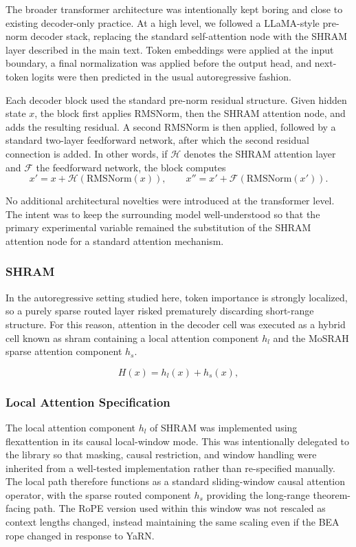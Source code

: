 \documentclass[11pt]{article}
\begin{document}
The broader transformer architecture was intentionally kept boring and close to existing decoder-only practice. At a high level, we followed a LLaMA-style pre-norm decoder stack, replacing the standard self-attention node with the SHRAM layer described in the main text. Token embeddings were applied at the input boundary, a final normalization was applied before the output head, and next-token logits were then predicted in the usual autoregressive fashion.

Each decoder block used the standard pre-norm residual structure. Given hidden state $x$, the block first applies RMSNorm, then the SHRAM attention node, and adds the resulting residual. A second RMSNorm is then applied, followed by a standard two-layer feedforward network, after which the second residual connection is added. In other words, if $\mathcal{H}$ denotes the SHRAM attention layer and $\mathcal{F}$ the feedforward network, the block computes
\[
x' = x + \mathcal{H}(\mathrm{RMSNorm}(x)),
\qquad
x'' = x' + \mathcal{F}(\mathrm{RMSNorm}(x')).
\]

No additional architectural novelties were introduced at the transformer level. The intent was to keep the surrounding model well-understood so that the primary experimental variable remained the substitution of the SHRAM attention node for a standard attention mechanism.

\subsubsection{SHRAM}


In the autoregressive setting studied here, token importance is strongly localized, so a purely sparse routed layer risked prematurely discarding short-range structure. For this reason, attention in the decoder cell was executed as a hybrid cell known as shram containing a local attention component $h_l$ and the MoSRAH sparse attention component $h_s$.

\[
H(x) = h_l(x) + h_s(x),
\]

\subsubsection{Local Attention Specification}
\label{app:local_attention}

The local attention component $h_l$ of SHRAM was implemented using flexattention in its causal local-window mode. This was intentionally delegated to the library so that masking, causal restriction, and window handling were inherited from a well-tested implementation rather than re-specified manually. The local path therefore functions as a standard sliding-window causal attention operator, with the sparse routed component $h_s$ providing the long-range theorem-facing path. The RoPE version used within this window was not rescaled as context lengths changed, instead maintaining the same scaling even if the BEA rope changed in response to YaRN.
\end{document}
